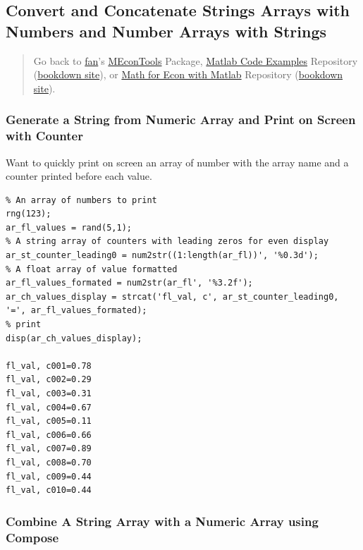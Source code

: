 \documentclass[
]{book}
\begin{document}
\hypertarget{convert-and-concatenate-strings-arrays-with-numbers-and-number-arrays-with-strings}{%
\subsection{Convert and Concatenate Strings Arrays with Numbers and Number Arrays with Strings}\label{convert-and-concatenate-strings-arrays-with-numbers-and-number-arrays-with-strings}}

\begin{quote}
Go back to \href{http://fanwangecon.github.io/}{fan}'s \href{https://fanwangecon.github.io/MEconTools/}{MEconTools} Package, \href{https://fanwangecon.github.io/M4Econ/}{Matlab Code Examples} Repository (\href{https://fanwangecon.github.io/M4Econ/bookdown}{bookdown site}), or \href{https://fanwangecon.github.io/Math4Econ/}{Math for Econ with Matlab} Repository (\href{https://fanwangecon.github.io/Math4Econ/bookdown}{bookdown site}).
\end{quote}

\hypertarget{generate-a-string-from-numeric-array-and-print-on-screen-with-counter}{%
\subsubsection{Generate a String from Numeric Array and Print on Screen with Counter}\label{generate-a-string-from-numeric-array-and-print-on-screen-with-counter}}

Want to quickly print on screen an array of number with the array name
and a counter printed before each value.

\begin{verbatim}
% An array of numbers to print
rng(123);
ar_fl_values = rand(5,1);
% A string array of counters with leading zeros for even display
ar_st_counter_leading0 = num2str((1:length(ar_fl))', '%0.3d');
% A float array of value formatted
ar_fl_values_formated = num2str(ar_fl', '%3.2f');
ar_ch_values_display = strcat('fl_val, c', ar_st_counter_leading0, '=', ar_fl_values_formated);
% print
disp(ar_ch_values_display);

fl_val, c001=0.78
fl_val, c002=0.29
fl_val, c003=0.31
fl_val, c004=0.67
fl_val, c005=0.11
fl_val, c006=0.66
fl_val, c007=0.89
fl_val, c008=0.70
fl_val, c009=0.44
fl_val, c010=0.44
\end{verbatim}

\hypertarget{combine-a-string-array-with-a-numeric-array-using-compose}{%
\subsubsection{Combine A String Array with a Numeric Array using Compose}\label{combine-a-string-array-with-a-numeric-array-using-compose}}
\end{document}
